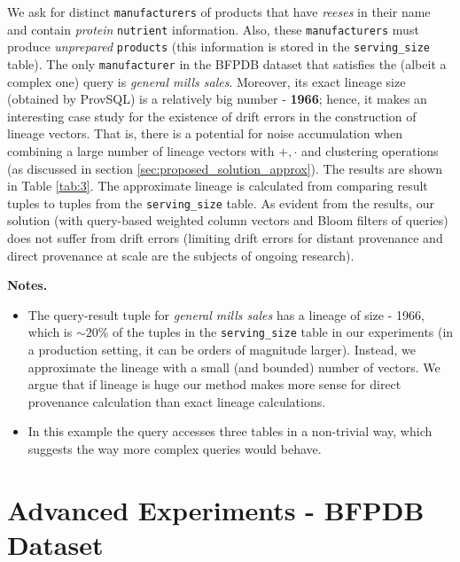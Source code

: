 \begin{example-withrun}\label{experiment:3}
% 
We ask for distinct \texttt{manufacturers} of products that have \textit{reeses} in their name and contain \textit{protein}
                         \texttt{nutrient} information.
                Also, these \texttt{manufacturers} must produce \textit{unprepared} \texttt{products} (this information is stored in the \texttt{serving\_size} table).
The only \texttt{manufacturer} in the BFPDB dataset that satisfies the (albeit a complex one) query is \textit{general mills sales}. Moreover, its exact lineage size (obtained by ProvSQL) is a relatively big number - \textbf{1966}; hence, it makes an interesting case study for the existence of drift errors in the construction of lineage vectors. That is, there is a potential for noise accumulation when combining a large number of lineage vectors with $+,\cdot$ and clustering operations (as discussed in section \ref{sec:proposed_solution_approx}). 
The results are shown in Table \ref{tab:3}. The approximate lineage is calculated from comparing result tuples to tuples from the \texttt{serving\_size} table. As evident from the results, our solution (with query-based weighted column vectors and Bloom filters of queries) does not suffer from drift errors (limiting drift errors for distant provenance and direct provenance at scale are the subjects of ongoing research).
\par\textbf{Notes.} 
\begin{itemize}
    \item The query-result tuple for \textit{general mills sales} has a lineage of size - 1966, which is ${\sim}20\%$ of the tuples in the \texttt{serving\_size} table in our experiments (in a production setting, it can be orders of magnitude larger). Instead, we approximate the lineage with a small (and bounded) number of vectors. We argue that if lineage is huge our method makes more sense for direct provenance calculation than exact lineage calculations.
    \item In this example the query accesses three tables in a non-trivial way, which suggests the way more complex queries would behave.
\end{itemize}



\section{Advanced Experiments - BFPDB Dataset}


\end{example-withrun}